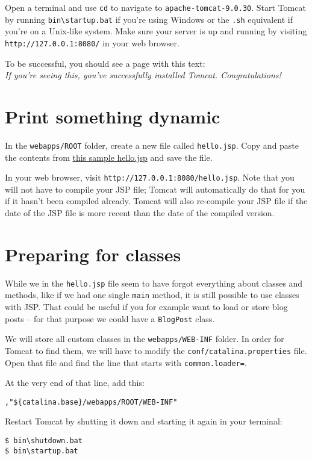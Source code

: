\documentclass[a4paper, english]{article}
\newcommand{\tomcatfolder}{apache-tomcat-9.0.30}
\begin{document}
        Open a terminal and use \texttt{cd} to navigate to \texttt{\tomcatfolder}. Start Tomcat by running \texttt{bin\textbackslash startup.bat} if you're using Windows or the \texttt{.sh} equivalent if you're on a Unix-like system. Make sure your server is up and running by visiting \texttt{http://127.0.0.1:8080/} in your web browser.
        
        To be successful, you should see a page with this text: \\
        \emph{If you're seeing this, you've successfully installed Tomcat. Congratulations!}

    \newpage
    \section{Print something dynamic}
        In the \texttt{webapps/ROOT} folder, create a new file called \texttt{hello.jsp}. Copy and paste the contents from \href{https://klistra.in/Y7PHSLdX}{this sample hello.jsp} and save the file.

        In your web browser, visit \texttt{http://127.0.0.1:8080/hello.jsp}. Note that you will not have to compile your JSP file; Tomcat will automatically do that for you if it hasn't been compiled already. Tomcat will also re-compile your JSP file if the date of the JSP file is more recent than the date of the compiled version.

    \section{Preparing for classes}
        While we in the \texttt{hello.jsp} file seem to have forgot everything about classes and methods, like if we had one single \texttt{main} method, it is still possible to use classes with JSP. That could be useful if you for example want to load or store blog posts -- for that purpose we could have a \texttt{BlogPost} class.

        We will store all custom classes in the \texttt{webapps/WEB-INF} folder. In order for Tomcat to find them, we will have to modify the \texttt{conf/catalina.properties} file. Open that file and find the line that starts with \texttt{common.loader=}.
        
        At the very end of that line, add this:
        \begin{lstlisting}
,"${catalina.base}/webapps/ROOT/WEB-INF"
\end{lstlisting}

        Restart Tomcat by shutting it down and starting it again in your terminal:
        \begin{lstlisting}
$ bin\shutdown.bat
$ bin\startup.bat
\end{lstlisting}
        
\end{document}
